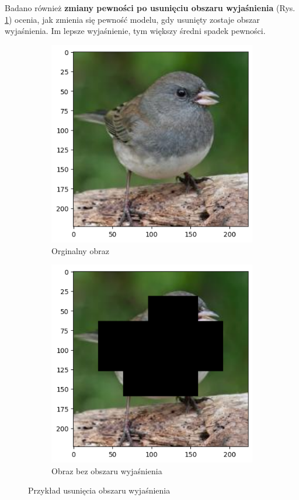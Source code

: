 Badano również \textbf{zmiany pewności po usunięciu obszaru wyjaśnienia} (Rys. \ref{rys:example_no_exp}) ocenia, jak zmienia się pewność modelu, gdy usunięty zostaje obszar wyjaśnienia.
Im lepsze wyjaśnienie, tym większy średni spadek pewności.

\begin{figure}[h]
	\begin{subfigure}[b]{0.45\textwidth}
		\centering\includegraphics[width=.9\textwidth]{img/parameters/quality/base}
		\caption{Orginalny obraz}
	\end{subfigure}
	\begin{subfigure}[b]{0.45\textwidth}
		\centering\includegraphics[width=.9\textwidth]{img/parameters/quality/wo_mask}
		\caption{Obraz bez obszaru wyjaśnienia}
	\end{subfigure}
	\caption{Przykład usunięcia obszaru wyjaśnienia}
	\label{rys:example_no_exp}
\end{figure}

